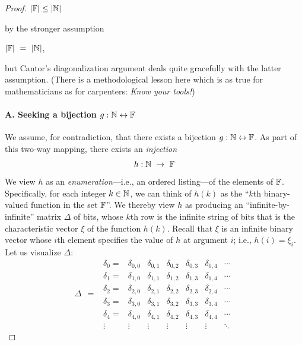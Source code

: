 \begin{proof}
\hspace*{.35in}$|\mathbb{F}| \leq |\mathbb{N}|$

\smallskip

\noindent
by the stronger assumption

\smallskip

\hspace*{.35in}$|\mathbb{F}| \ = \ |\mathbb{N}|$,

\smallskip

\noindent
but Cantor's diagonalization argument deals quite gracefully with the latter assumption.  (There is a methodological lesson here which is as true for mathematicians as for carpenters:  {\em Know your tools!})

\paragraph{A. Seeking a bijection $g: \mathbb{N} \leftrightarrow \mathbb{F}$}

We assume, for contradiction, that there exists a bijection $g: \mathbb{N} \leftrightarrow \mathbb{F}$.  As part of this two-way mapping, there exists an {\em injection}
\[  h: \mathbb{N} \ \rightarrow \ \mathbb{F}  \]
We view $h$ as an {\em enumeration}---i.e., an ordered listing---of the elements of $\mathbb{F}$.  Specifically, for each integer $k \in \mathbb{N}$, we can think of $h(k)$ as the ``$k$th binary-valued function in the set $\mathbb{F}$''.  We thereby view $h$ as producing an ``infinite-by-infinite'' matrix $\Delta$ of bits, whose $k$th row is the infinite string of bits that is the characteristic vector $\xi$ of the function $h(k)$.  Recall that $\xi$ is an infinite binary vector whose $i$th element
specifies the value of $h$ at argument $i$; i.e., $h(i) = \xi_i$.  Let us visualize $\Delta$:
\[ \Delta \ \ = \ \
\begin{array}{ccccccc}
\delta_0 = &
\delta_{0,0} & \delta_{0,1} & \delta_{0,2} & \delta_{0,3} &
	\delta_{0,4} & \cdots \\
\delta_1 = &
\delta_{1,0} & \delta_{1,1} & \delta_{1,2} & \delta_{1,3} &
	\delta_{1,4} & \cdots \\
\delta_2 = &
\delta_{2,0} & \delta_{2,1} & \delta_{2,2} & \delta_{2,3} &
	\delta_{2,4} & \cdots \\
\delta_3 = &
\delta_{3,0} & \delta_{3,1} & \delta_{3,2} & \delta_{3,3} &
	\delta_{3,4} & \cdots \\ 
\delta_4 = &
\delta_{4,0} & \delta_{4,1} & \delta_{4,2} & \delta_{4,3} &
	\delta_{4,4} & \cdots \\ 
\vdots &
\vdots  & \vdots  & \vdots  & \vdots  & \vdots  & \ddots
\end{array}
\]


\end{proof}
